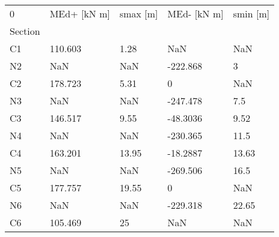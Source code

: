 \begin{tabular}{lllll}
\toprule
0 & MEd+ [kN m] & smax [m] & MEd- [kN m] & smin [m] \\
Section &             &          &             &          \\
\midrule
C1      &     110.603 &     1.28 &         NaN &      NaN \\
N2      &         NaN &      NaN &    -222.868 &        3 \\
C2      &     178.723 &     5.31 &           0 &      NaN \\
N3      &         NaN &      NaN &    -247.478 &      7.5 \\
C3      &     146.517 &     9.55 &    -48.3036 &     9.52 \\
N4      &         NaN &      NaN &    -230.365 &     11.5 \\
C4      &     163.201 &    13.95 &    -18.2887 &    13.63 \\
N5      &         NaN &      NaN &    -269.506 &     16.5 \\
C5      &     177.757 &    19.55 &           0 &      NaN \\
N6      &         NaN &      NaN &    -229.318 &    22.65 \\
C6      &     105.469 &       25 &         NaN &      NaN \\
\bottomrule
\end{tabular}
